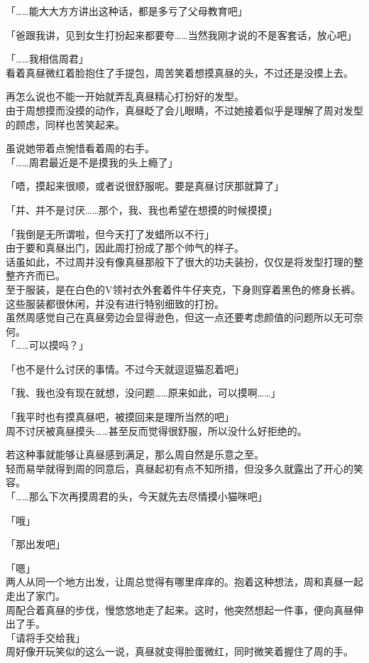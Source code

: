 「……能大大方方讲出这种话，都是多亏了父母教育吧」

「爸跟我讲，见到女生打扮起来都要夸……当然我刚才说的不是客套话，放心吧」

「……我相信周君」\\

看着真昼微红着脸抱住了手提包，周苦笑着想摸真昼的头，不过还是没摸上去。

再怎么说也不能一开始就弄乱真昼精心打扮好的发型。\\

由于周想摸而没摸的动作，真昼眨了会儿眼睛，不过她接着似乎是理解了周对发型的顾虑，同样也苦笑起来。

虽说她带着点惋惜看着周的右手。\\

「……周君最近是不是摸我的头上瘾了」

「唔，摸起来很顺，或者说很舒服呢。要是真昼讨厌那就算了」

「并、并不是讨厌……那个，我、我也希望在想摸的时候摸摸」

「我倒是无所谓啦，但今天打了发蜡所以不行」\\

由于要和真昼出门，因此周打扮成了那个帅气的样子。\\

话虽如此，不过周并没有像真昼那般下了很大的功夫装扮，仅仅是将发型打理的整整齐齐而已。\\

至于服装，是在白色的V领衬衣外套着件牛仔夹克，下身则穿着黑色的修身长裤。这些服装都很休闲，并没有进行特别细致的打扮。\\

虽然周感觉自己在真昼旁边会显得逊色，但这一点还要考虑颜值的问题所以无可奈何。\\

「……可以摸吗？」

「也不是什么讨厌的事情。不过今天就逗逗猫忍着吧」

「我、我也没有现在就想，没问题……原来如此，可以摸啊……」

「我平时也有摸真昼吧，被摸回来是理所当然的吧」\\

周不讨厌被真昼摸头……甚至反而觉得很舒服，所以没什么好拒绝的。

若这种事就能够让真昼感到满足，那么周自然是乐意之至。\\

轻而易举就得到周的同意后，真昼起初有点不知所措，但没多久就露出了开心的笑容。\\

「……那么下次再摸周君的头，今天就先去尽情摸小猫咪吧」

「哦」

「那出发吧」

「嗯」\\

两人从同一个地方出发，让周总觉得有哪里痒痒的。抱着这种想法，周和真昼一起走出了家门。\\

周配合着真昼的步伐，慢悠悠地走了起来。这时，他突然想起一件事，便向真昼伸出了手。\\

「请将手交给我」\\

周好像开玩笑似的这么一说，真昼就变得脸蛋微红，同时微笑着握住了周的手。
